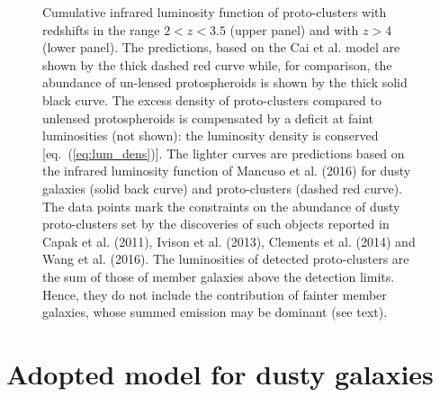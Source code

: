 \documentclass[useAMS,usenatbib]{mn2e}
\begin{document}
\begin{figure}
\hspace{-5.0cm}
\vspace{-0.5cm}
\caption{Cumulative infrared luminosity function of proto-clusters with
  redshifts in the range $2<z<3.5$ (upper panel) and with $z>4$ (lower panel). The
  predictions, based on the Cai et al. model are shown by the thick dashed red curve while, for comparison, the abundance of
un-lensed protospheroids is shown by the thick solid black curve. The
excess density of proto-clusters compared to unlensed protospheroids
is compensated by a deficit at faint luminosities (not shown): the
luminosity density is conserved [eq.~(\protect\ref{eq:lum_dens})].
The lighter curves are predictions based on the infrared
  luminosity function of Mancuso et al. (2016) for dusty
  galaxies (solid back curve) and proto-clusters (dashed red curve).
The data
points mark the constraints on the abundance of
  dusty proto-clusters set by the discoveries of such objects reported
  in Capak et al. (2011), Ivison et al. (2013), Clements et al. (2014)
  and Wang et al. (2016). The luminosities of detected proto-clusters are the sum of those of member galaxies above the detection limits. Hence, they do not include the contribution of fainter member galaxies, whose summed emission may be dominant (see text).  }
\label{fig:NgtLirclump}
\end{figure}



\section{Adopted model for dusty galaxies}\label{sec:galaxy_model}
\end{document}
